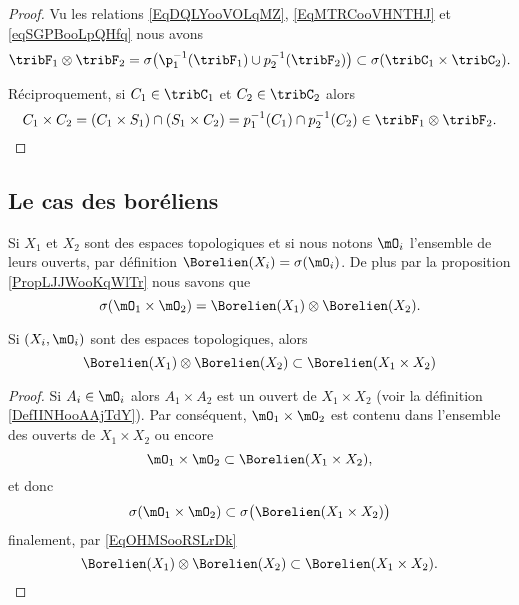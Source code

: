 \begin{proof}
    Vu les relations \eqref{EqDQLYooVOLqMZ}, \eqref{EqMTRCooVHNTHJ} et \eqref{eqSGPBooLpQHfq} nous avons
    \begin{equation}
        \tribF_1\otimes\tribF_2=\sigma\big( \p_1^{-1}(\tribF_1)\cup p_2^{-1}(\tribF_2) \big)\subset\sigma(\tribC_1\times \tribC_2).
    \end{equation}

    Réciproquement, si \( C_1\in \tribC_1\) et \( C_2\in \tribC_2\) alors
    \begin{equation}
        C_1\times C_2=(C_1\times S_1)\cap(S_1\times C_2)=p_1^{-1}(C_1)\cap p_2^{-1}(C_2)\in\tribF_1\otimes\tribF_2.
    \end{equation}
\end{proof}

\subsection{Le cas des boréliens}

Si \( X_1\) et  \( X_2\) sont des espaces topologiques et si nous notons \( \mO_i\) l'ensemble de leurs ouverts, par définition \( \Borelien(X_i)=\sigma(\mO_i)\). De plus par la proposition \ref{PropLJJWooKqWlTr} nous savons que
\begin{equation}        \label{EqOHMSooRSLrDk}
    \sigma(\mO_1\times \mO_2)=\Borelien(X_1)\otimes \Borelien(X_2).
\end{equation}

\begin{lemma}       \label{LemDEDQooJyzXgC}
    Si \( (X_i,\mO_i)\) sont des espaces topologiques, alors
    \begin{equation}
        \Borelien(X_1)\otimes \Borelien(X_2)\subset \Borelien(X_1\times X_2)
    \end{equation}
\end{lemma}

\begin{proof}
    Si \( A_i\in \mO_i\) alors \( A_1\times A_2\) est un ouvert de \( X_1\times X_2\) (voir la définition \ref{DefIINHooAAjTdY}). Par conséquent, \( \mO_1\times \mO_2\) est contenu dans l'ensemble des ouverts de \( X_1\times X_2\) ou encore
    \begin{equation}
        \mO_1\times \mO_2\subset\Borelien(X_1\times X_2),
    \end{equation}
    et donc
    \begin{equation}
        \sigma(\mO_1\times \mO_2)\subset\sigma\big( \Borelien(X_1\times X_2) \big)
    \end{equation}
    finalement, par \eqref{EqOHMSooRSLrDk}
    \begin{equation}
        \Borelien(X_1)\otimes\Borelien(X_2)\subset\Borelien(X_1\times X_2).
    \end{equation}
\end{proof}

